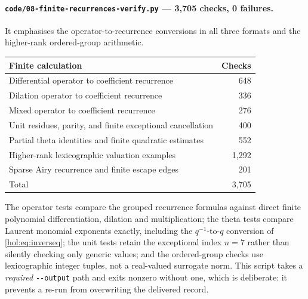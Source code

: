 \documentclass[11pt]{article}
\numberwithin{equation}{section}
\theoremstyle{definition}
\theoremstyle{remark}
\begin{document}
\paragraph{\texttt{code/08-finite-recurrences-verify.py} --- 3{,}705 checks,
0 failures.}
It emphasises the operator-to-recurrence conversions in all three formats and
the higher-rank ordered-group arithmetic.
\begin{center}
\begin{tabularx}{\textwidth}{@{}X r@{}}
\toprule
Finite calculation & Checks\\
\midrule
Differential operator to coefficient recurrence & 648\\
Dilation operator to coefficient recurrence & 336\\
Mixed operator to coefficient recurrence & 276\\
Unit residues, parity, and finite exceptional cancellation & 400\\
Partial theta identities and finite quadratic estimates & 552\\
Higher-rank lexicographic valuation examples & 1{,}292\\
Sparse Airy recurrence and finite escape edges & 201\\
\midrule
Total & 3{,}705\\
\bottomrule
\end{tabularx}
\end{center}
The operator tests compare the grouped recurrence formulas against direct
finite polynomial differentiation, dilation and multiplication; the theta
tests compare Laurent monomial exponents exactly, including the $q^{-1}$-to-$q$
conversion of \eqref{hol:eq:inverseq}; the unit tests retain the exceptional
index $n=7$ rather than silently checking only generic values; and the
ordered-group checks use lexicographic integer tuples, not a real-valued
surrogate norm. This script takes a \emph{required} \verb|--output| path and
exits nonzero without one, which is deliberate: it prevents a re-run from
overwriting the delivered record.
\end{document}
